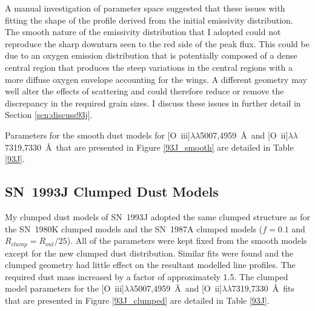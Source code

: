 A manual investigation of parameter space suggested that these issues with fitting the shape of the profile derived from the initial emissivity distribution.  The smooth nature of the emissivity distribution that I adopted could not reproduce the sharp downturn seen to the red side of the peak flux.  This could be due to an oxygen emission distribution that is potentially composed of a dense central region that produces the steep variations in the central regions with a more diffuse oxygen envelope accounting for the wings.  A different geometry may well alter the effects of scattering and could therefore reduce or remove the discrepancy in the required grain sizes.  I discuss these issues in further detail in Section \ref{scn:discuss93j}.

Parameters for the smooth dust models for [O~{\sc iii}]$\lambda\lambda$5007,4959~\AA\ and [O~{\sc ii}]$\lambda\lambda$7319,7330~\AA\   that are presented in Figure \ref{93J_smooth} are detailed in Table \ref{93J}. 
 
\subsection{SN~1993J Clumped Dust Models}

My clumped dust models of SN~1993J adopted the same clumped structure as for the SN~1980K clumped models and the SN~1987A clumped models ($f=0.1$ and $R_{clump}=R_{out}/25$).  All of the parameters were kept fixed from the smooth models except for the new clumped dust distribution.  Similar fits were found and the clumped geometry had little effect on the resultant modelled line profiles.   The required dust mass increased by a factor of approximately 1.5.  The clumped model parameters for the [O~{\sc iii}]$\lambda\lambda$5007,4959~\AA\ and [O~{\sc ii}]$\lambda\lambda$7319,7330~\AA\ fits that are presented in Figure \ref{93J_clumped} are detailed in Table \ref{93J}. 

